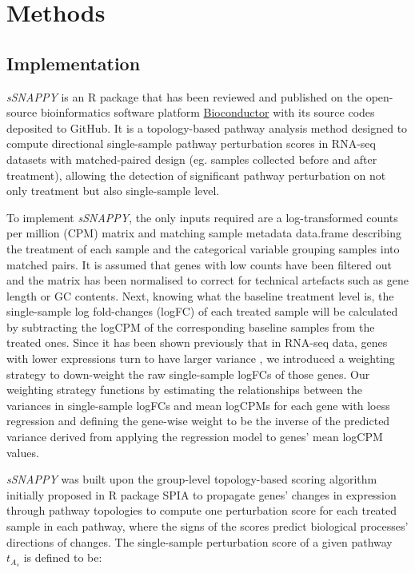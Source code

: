 \documentclass[9pt,a4paper,]{extarticle}
\begin{document}
\hypertarget{methods}{%
\section{Methods}\label{methods}}

\hypertarget{implementation}{%
\subsection{Implementation}\label{implementation}}

\emph{sSNAPPY} is an R package that has been reviewed and published on the open-source bioinformatics software platform \href{https://bioconductor.org/packages/release/bioc/html/*sSNAPPY*.html}{Bioconductor} with its source codes deposited to GitHub. It is a topology-based pathway analysis method designed to compute directional single-sample pathway perturbation scores in RNA-seq datasets with matched-paired design (eg. samples collected before and after treatment), allowing the detection of significant pathway perturbation on not only treatment but also single-sample level.

To implement \emph{sSNAPPY}, the only inputs required are a log-transformed counts per million (CPM) matrix and matching sample metadata data.frame describing the treatment of each sample and the categorical variable grouping samples into matched pairs. It is assumed that genes with low counts have been filtered out and the matrix has been normalised to correct for technical artefacts such as gene length or GC contents. Next, knowing what the baseline treatment level is, the single-sample log fold-changes (logFC) of each treated sample will be calculated by subtracting the logCPM of the corresponding baseline samples from the treated ones. Since it has been shown previously that in RNA-seq data, genes with lower expressions turn to have larger variance\citep{Law2014} , we introduced a weighting strategy to down-weight the raw single-sample logFCs of those genes. Our weighting strategy functions by estimating the relationships between the variances in single-sample logFCs and mean logCPMs for each gene with loess regression and defining the gene-wise weight to be the inverse of the predicted variance derived from applying the regression model to genes' mean logCPM values.

\emph{sSNAPPY} was built upon the group-level topology-based scoring algorithm initially proposed in R package SPIA\citep{Tarca2009} to propagate genes' changes in expression through pathway topologies to compute one perturbation score for each treated sample in each pathway, where the signs of the scores predict biological processes' directions of changes. The single-sample perturbation score of a given pathway \(t_{A_s}\) is defined to be:
\end{document}
